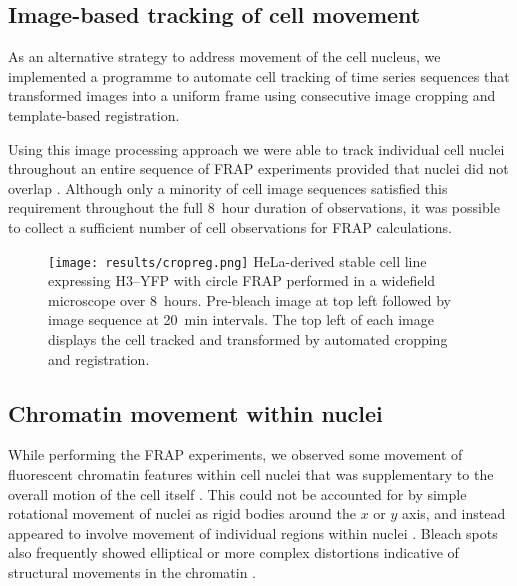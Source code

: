     \subsection{Image-based tracking of cell movement}

    As an alternative strategy to address movement of the cell nucleus, 
    we implemented a programme to automate cell tracking of time series sequences
    that transformed images into a uniform frame using 
    consecutive image cropping and template-based registration.

    Using this image processing approach we were able to track individual cell nuclei
    throughout an entire sequence of FRAP experiments 
    provided that nuclei did not overlap .
    Although only a minority of cell image sequences satisfied this requirement
    throughout the full 8~hour duration of observations,
    it was possible to collect a sufficient number of cell observations for FRAP calculations.

    \begin{figure}
      \centering
      \texttt{[image: results/cropreg.png]}
        {
         HeLa-derived stable cell line expressing H3--YFP
         with circle FRAP performed in a widefield microscope over 8~hours.
         Pre-bleach image at top left followed by image sequence at 20~min intervals.
         The top left of each image displays the cell tracked and transformed
         by automated cropping and registration.
        }
      \label{fig:kill-frap:cropreg}
    \end{figure}

  \subsection{Chromatin movement within nuclei}

    While performing the FRAP experiments, we observed some movement of fluorescent chromatin features
    within cell nuclei that was supplementary to the overall motion of the cell itself .
    This could not be accounted for by simple rotational movement of nuclei
    as rigid bodies around the $x$ or $y$ axis, 
    and instead appeared to involve movement of individual regions within nuclei .
    Bleach spots also frequently showed elliptical or more complex distortions
    indicative of structural movements in the chromatin .

